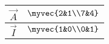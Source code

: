 \begin{tabular}{|c|c|}
\hline
	$\vec{A}$ & $\myvec{2&1\\7&4}$\\
	\hline
	$\vec{I}$ & $\myvec{1&0\\0&1}$\\
	\hline
\end{tabular}
